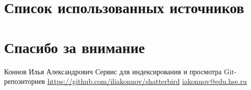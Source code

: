 \documentclass[aspectratio=169,professionalfonts,10pt]{beamer}
\begin{document}
\section{Список использованных источников}
\begin{frame}[shrink=30]{\insertsection}
    \vspace{0.5cm}
    \printbibliography
\end{frame}

\section{Спасибо за внимание}
\begingroup
{}
\begin{frame}{\insertsection}
\centering
    \vfill Коннов Илья Александрович
    \vfill Сервис для индексирования и просмотра Git-репозиториев
    \vfill \url{https://github.com/iliakonnov/shatterbird}
    \vfill \url{iakonnov@edu.hse.ru}
    \vfill
\end{frame}
\endgroup
\end{document}
